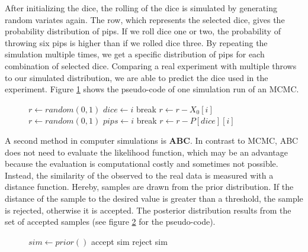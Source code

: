 After initializing the dice, the rolling of the dice is simulated by generating random variates again. The row, which represents the selected dice, gives the probability distribution of pips. If we roll dice one or two, the probability of throwing six pips is higher than if we rolled dice three. By repeating the simulation multiple times, we get a specific distribution of pips for each combination of selected dice. Comparing a real experiment with multiple throws to our simulated distribution, we are able to predict the dice used in the experiment. Figure \ref{MCMC} shows the pseudo-code of one simulation run of an MCMC.
\begin{figure}
\begin{algorithmic}
\State $r \gets random(0,1)$
\State $dice \gets i$
\State break
\Else
\State $r \gets r - X_0[i]$
\EndIf
\EndFor
\State $r \gets random(0,1)$
\State $pips \gets i$
\State break
\Else
\State $r \gets r - P[dice][i]$
\EndIf
\EndFor
\end{algorithmic}
\label{MCMC}
\end{figure}

A second method in computer simulations is \textbf{\ac{ABC}}. In contrast to \ac{MCMC}, \ac{ABC} does not need to evaluate the likelihood function, which may be an advantage because the evaluation is computational costly and sometimes not possible. Instead, the similarity of the observed to the real data is measured with a distance function. Hereby, samples are drawn from the prior distribution. If the distance of the sample to the desired value is greater than a threshold, the sample is rejected, otherwise it is accepted. The posterior distribution results from the set of accepted samples (see figure \ref{ABC} for the pseudo-code).\cite{ABC}
\begin{figure}[h]
\begin{algorithmic}
\State $sim \gets prior()$
\State accept sim
\Else
\State reject sim
\EndIf
\end{algorithmic}
\label{ABC}
\end{figure}

